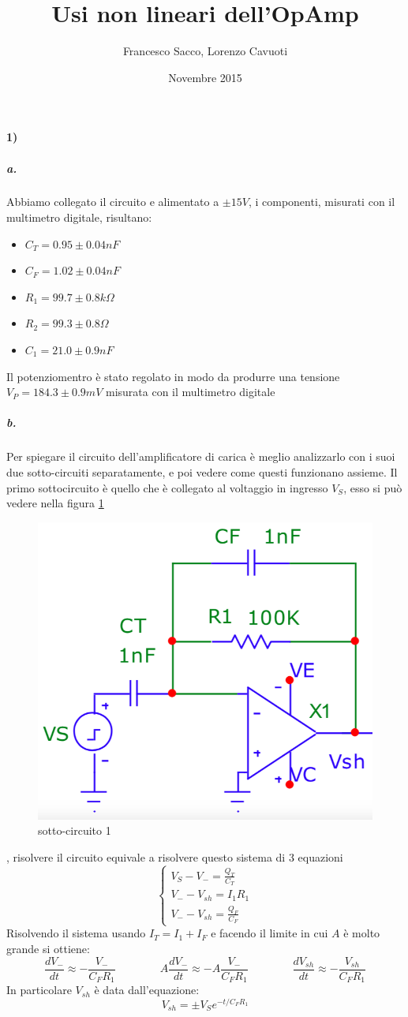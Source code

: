 \documentclass{article}
\date{Novembre 2015}
\author{Francesco Sacco, Lorenzo Cavuoti}
\title{Usi non lineari dell'OpAmp}
\newcommand{\vz}{V_S}
\begin{document}
	\maketitle
	\paragraph{1)}
	\subparagraph{a.}
	Abbiamo collegato il circuito e alimentato a $\pm 15V$, i componenti, misurati con il multimetro digitale, risultano:
	\begin{itemize}
		\item $C_T=0.95\pm0.04 nF$
		\item $C_F=1.02\pm0.04 nF$
		\item $R_1=99.7\pm0.8 k\Omega$
		\item $R_2=99.3\pm0.8 \Omega$
		\item $C_1=21.0\pm0.9 nF$
	\end{itemize}
	Il potenziomentro è stato regolato in modo da produrre una tensione $V_P=184.3\pm0.9 mV$ misurata con il multimetro digitale
	
	\subparagraph{b.}
	Per spiegare il circuito dell'amplificatore di carica è meglio analizzarlo con i suoi due sotto-circuiti separatamente, e poi vedere come questi funzionano assieme.\newline
	Il primo sottocircuito è quello che è collegato al voltaggio in ingresso $V_S$, esso si può vedere nella figura \ref{fig:circ1}
	\begin{figure}
		\label{fig:circ1}
		\centering
		\includegraphics[width=0.45\linewidth]{immagini/circ1a.png}
		\caption{sotto-circuito 1}
	\end{figure}
	, risolvere il circuito equivale a risolvere questo sistema di 3 equazioni
	\begin{equation}
	\begin{cases}
	V_S-V_-=\frac{Q_T}{C_T}\\
	V_--V_{sh}=I_1R_1\\
	V_--V_{sh}=\frac{Q_F}{C_F}
	\end{cases}
	\end{equation}
	Risolvendo il sistema usando $I_T=I_1+I_F$ e facendo il limite in cui $A$ è molto grande si ottiene:
	\[
	\frac{dV_-}{dt}\approx-\frac{V_-}{C_FR_1}\qquad\qquad
	A\frac{dV_-}{dt}\approx-A\frac{V_-}{C_FR_1}\qquad\qquad
	\frac{dV_{sh}}{dt}\approx-\frac{V_{sh}}{C_FR_1}
	\]
	In particolare $V_{sh}$ è data dall'equazione:\newline
	\begin{equation}
	V_{sh}=\pm \vz e^{-t/C_FR_1}
	\end{equation}
	
\end{document}
